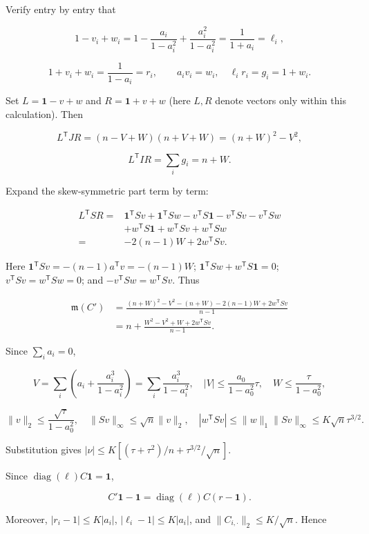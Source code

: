 \documentclass[11pt,a4paper]{article}
\begin{document}
Verify entry by entry that

\[
1-v_i+w_i=1-\frac{a_i}{1-a_i^2}+\frac{a_i^2}{1-a_i^2}
=\frac1{1+a_i}=\ell_i,
\]

\[
1+v_i+w_i=\frac1{1-a_i}=r_i,\qquad
a_iv_i=w_i,\quad \ell_ir_i=g_i=1+w_i.
\]

Set \(L=\mathbf1-v+w\) and \(R=\mathbf1+v+w\) (here \(L,R\) denote vectors only within this calculation). Then

\[
L^{\mathsf T}JR=(n-V+W)(n+V+W)=(n+W)^2-V^2,
\]

\[
L^{\mathsf T}IR=\sum_i g_i=n+W.
\]

Expand the skew-symmetric part term by term:

\[
\begin{aligned}
L^{\mathsf T}SR
={}&\mathbf1^{\mathsf T}Sv+\mathbf1^{\mathsf T}Sw
-v^{\mathsf T}S\mathbf1-v^{\mathsf T}Sv-v^{\mathsf T}Sw\\
&+w^{\mathsf T}S\mathbf1+w^{\mathsf T}Sv+w^{\mathsf T}Sw\\
={}&-2(n-1)W+2w^{\mathsf T}Sv.
\end{aligned}
\]

Here \(\mathbf1^{\mathsf T}Sv=-(n-1)a^{\mathsf T}v=-(n-1)W\); \(\mathbf1^{\mathsf T}Sw+w^{\mathsf T}S\mathbf1=0\); \(v^{\mathsf T}Sv=w^{\mathsf T}Sw=0\); and \(-v^{\mathsf T}Sw=w^{\mathsf T}Sv\). Thus

\[
\begin{aligned}
\mathfrak m(C')&=\frac{(n+W)^2-V^2-(n+W)-2(n-1)W+2w^{\mathsf T}Sv}{n-1}\\
&=n+\frac{W^2-V^2+W+2w^{\mathsf T}Sv}{n-1}.
\end{aligned}
\]

Since \(\sum_i a_i=0\),

\[
V=\sum_i\left(a_i+\frac{a_i^3}{1-a_i^2}\right)
=\sum_i\frac{a_i^3}{1-a_i^2},\quad
|V|\le\frac{a_0}{1-a_0^2}\tau,
\quad W\le\frac\tau{1-a_0^2},
\]

\[
\|v\|_2\le\frac{\sqrt\tau}{1-a_0^2},\quad
\|Sv\|_\infty\le\sqrt n\|v\|_2,\quad
|w^{\mathsf T}Sv|\le\|w\|_1\|Sv\|_\infty\le K\sqrt n\tau^{3/2}.
\]

Substitution gives \(|\nu|\le K[(\tau+\tau^2)/n+\tau^{3/2}/\sqrt n]\).

Since \(\operatorname{diag}(\ell)C\mathbf1=\mathbf1\),

\[
C'\mathbf1-\mathbf1=\operatorname{diag}(\ell)C(r-\mathbf1).
\]

Moreover, \(|r_i-1|\le K|a_i|\), \(|\ell_i-1|\le K|a_i|\), and \(\|C_{i,\cdot}\|_2\le K/\sqrt n\). Hence
\end{document}
